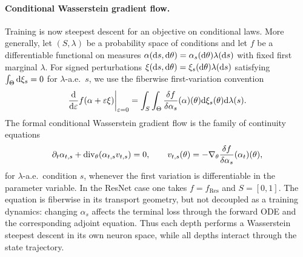 \paragraph{Conditional Wasserstein gradient flow.}
Training is now steepest descent for an objective on conditional laws. More generally, let $(S,\lambda)$ be a probability space of conditions and let $f$ be a differentiable functional on measures $\alpha(\mathrm{d} s,\mathrm{d}\theta)=\alpha_s(\mathrm{d}\theta)\lambda(\mathrm{d} s)$ with fixed first marginal $\lambda$. For signed perturbations $\xi(\mathrm{d} s,\mathrm{d}\theta)=\xi_s(\mathrm{d}\theta)\lambda(\mathrm{d} s)$ satisfying $\int_\Theta\mathrm{d}\xi_s=0$ for $\lambda$-a.e.\ $s$, we use the fiberwise first-variation convention
\[
	\frac{\mathrm{d}}{\mathrm{d}\varepsilon}f(\alpha+\varepsilon\xi)\bigg|_{\varepsilon=0}
	=
	\int_S\int_\Theta \frac{\delta f}{\delta\alpha_s}(\alpha)(\theta)\mathrm{d}\xi_s(\theta)\mathrm{d}\lambda(s).
\]
The formal conditional Wasserstein gradient flow is the family of continuity equations
\begin{equation}\label{eq-conditional-resnet-gradient-flow}
	\partial_t\alpha_{t,s}
	+\operatorname{div}_\theta(\alpha_{t,s}v_{t,s})=0,
	\qquad
	v_{t,s}(\theta)
	=
		-\nabla_\theta\frac{\delta f}{\delta\alpha_s}(\alpha_t)(\theta),
\end{equation}
for $\lambda$-a.e.\ condition $s$, whenever the first variation is differentiable in the parameter variable. In the ResNet case one takes $f=f_{\mathrm{Res}}$ and $S=[0,1]$. The equation is fiberwise in its transport geometry, but not decoupled as a training dynamics: changing $\alpha_s$ affects the terminal loss through the forward ODE and the corresponding adjoint equation. Thus each depth performs a Wasserstein steepest descent in its own neuron space, while all depths interact through the state trajectory.

